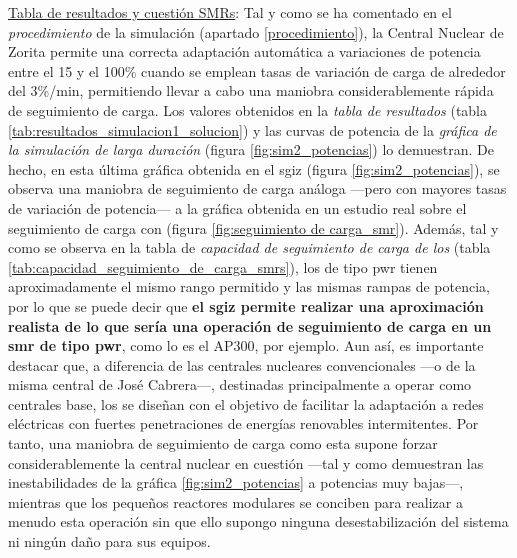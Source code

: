 \underline{Tabla de resultados y cuestión SMRs}: Tal y como se ha comentado en el \textit{procedimiento} de la simulación (apartado \ref{procedimiento}), la Central Nuclear de Zorita permite una correcta adaptación automática a variaciones de potencia entre el 15 y el 100\% cuando se emplean tasas de variación de carga de alrededor del 3\%/min, permitiendo llevar a cabo una maniobra considerablemente rápida de seguimiento de carga. Los valores obtenidos en la \textit{tabla de resultados} (tabla \ref{tab:resultados_simulacion1_solucion}) y las curvas de potencia de la \textit{gráfica de la simulación de larga duración} (figura \ref{fig:sim2_potencias}) lo demuestran. De hecho, en esta última gráfica obtenida en el \acrshort{sgiz} (figura \ref{fig:sim2_potencias}), se observa una maniobra de seguimiento de carga análoga ---pero con mayores tasas de variación de potencia--- a la gráfica obtenida en un estudio real sobre el seguimiento de carga con  (figura \ref{fig:seguimiento de carga_smr}). Además, tal y como se observa en la tabla de \textit{capacidad de seguimiento de carga de los } (tabla \ref{tab:capacidad_seguimiento_de_carga_smrs}), los  de tipo \acrshort{pwr} tienen aproximadamente el mismo rango permitido y las mismas rampas de potencia, por lo que se puede decir que \textbf{el \acrshort{sgiz} permite realizar una aproximación realista de lo que sería una operación de seguimiento de carga en un \acrshort{smr} de tipo \acrshort{pwr}}, como lo es el AP300, por ejemplo. Aun así, es importante destacar que, a diferencia de las centrales nucleares convencionales ---o de la misma central de José Cabrera---, destinadas principalmente a operar como centrales base, los  se diseñan con el objetivo de facilitar la adaptación a redes eléctricas con fuertes penetraciones de energías renovables intermitentes. Por tanto, una maniobra de seguimiento de carga como esta supone forzar considerablemente la central nuclear en cuestión ---tal y como demuestran las inestabilidades de la gráfica \ref{fig:sim2_potencias} a potencias muy bajas---, mientras que los pequeños reactores modulares se conciben para realizar a menudo esta operación sin que ello supongo ninguna desestabilización del sistema ni ningún daño para sus equipos.

